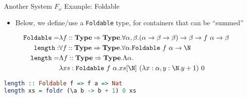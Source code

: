 \documentclass[leqno,presentation,usenames,dvipsnames]{beamer}
\newcommand{\Type}{\textbf{Type}}
\begin{document}

\begin{frame}[fragile]{Another System $F_\omega$ Example: Foldable}
    \begin{itemize}
        \item Below, we define/use a \texttt{Foldable} type, for containers that can be ``summed''
    \end{itemize}

    \footnotesize
    \begin{align*}
        \texttt{Foldable} = & \lambda f :: \Type \Rightarrow \Type. \forall \alpha, \beta. (\alpha \to \beta \to \beta) \to \beta \to f~\alpha \to \beta \\
        \texttt{length} : & \forall f :: \Type \Rightarrow \Type. \forall \alpha. \texttt{Foldable}~f~\alpha \to \N \\
        \texttt{length} = & \Lambda f :: \Type \Rightarrow \Type. \Lambda \alpha. \\
                          & \lambda xs : \texttt{Foldable}~f~\alpha. xs[\N]~(\lambda x : \alpha, y : \N. y + 1)~0
    \end{align*}

\begin{lstlisting}[language=haskell, basicstyle=\small\ttfamily, mathescape=true]
length :: Foldable f => f a => Nat
length xs = foldr (\a b -> b + 1) 0 xs
\end{lstlisting}
\end{frame}
\end{document}
